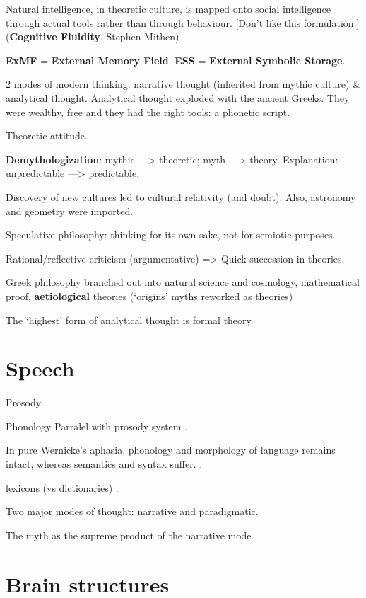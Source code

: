 \documentclass{article}
\begin{document}
Natural intelligence, in theoretic culture, is mapped onto social intelligence through actual tools rather than through behaviour. [Don't like this formulation.]
(\textbf{Cognitive Fluidity}, Stephen Mithen)

\textbf{ExMF} = \textbf{External Memory Field}.
\textbf{ESS} = \textbf{External Symbolic Storage}.

2 modes of modern thinking: narrative thought (inherited from mythic culture) \& analytical thought.
Analytical thought exploded with the ancient Greeks. They were wealthy, free and they had the right tools: a phonetic script.

Theoretic attitude.

\textbf{Demythologization}: mythic ---> theoretic; myth ---> theory. Explanation: unpredictable ---> predictable.

Discovery of new cultures led to cultural relativity (and doubt). Also, astronomy and geometry were imported.

Speculative philosophy: thinking for its own sake, not for semiotic purposes.

Rational/reflective criticism (argumentative) => Quick succession in theories.

Greek philosophy branched out into natural science and cosmology, mathematical proof, \textbf{aetiological} theories (`origins' myths reworked as theories)

The `highest' form of analytical thought is formal theory.

\section{Speech}

Prosody

Phonology
Parralel with prosody system \citep[p.~249]{donald1991}.

In pure Wernicke's aphasia, phonology and morphology of language remains intact, whereas semantics and syntax suffer. \citep[p.~249]{donald1991}.

lexicons (vs dictionaries) \citep[fig.~7.1, p.~251]{donald1991}.

Two major modes of thought: narrative and paradigmatic.

The myth as the supreme product of the narrative mode.

\section{Brain structures}
\end{document}
